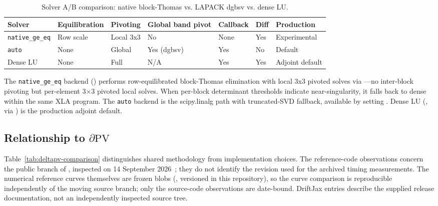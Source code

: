 \begin{table}[tbp]
\centering
\caption{Solver A/B comparison: native block-Thomas vs. LAPACK dgbsv vs. dense LU.}
\label{tab:solver-ab}
\begin{tabular}{@{}lllllll@{}}
\toprule
Solver & Equilibration & Pivoting & Global band pivot & Callback & Diff & Production \\
\midrule
\texttt{native\_ge\_eq} & Row scale & Local 3x3 & No & None & Yes & Experimental \\
\texttt{auto} & None & Global & Yes (dgbsv) & Yes & No & Default \\
Dense LU & None & Full & N/A & Yes & Yes & Adjoint default \\
\bottomrule
\end{tabular}
\end{table}


The \texttt{native\_ge\_eq} backend () performs row-equilibrated block-Thomas elimination with local 3x3 pivoted solves via ---no inter-block pivoting but per-element 3×3 pivoted local solves. When per-block determinant thresholds indicate near-singularity, it falls back to dense  within the same XLA program. The \texttt{auto} backend is the scipy.linalg  path with truncated-SVD fallback, available by setting . Dense LU (, via ) is the production adjoint default.

\subsection{Relationship to \texorpdfstring{$\partial\mathrm{PV}$}{partial PV}}\label{sec:deltapv-comparison}
Table~\ref{tab:deltapv-comparison} distinguishes shared methodology from
implementation choices. The reference-code observations concern the
public  branch of , inspected on
14 September 2026~\cite{deltapvsource}; they do not identify the revision
used for the archived timing measurements. The numerical reference
curves themselves are frozen blobs
(, versioned in
this repository), so the curve comparison is reproducible independently
of the moving source branch; only the source-code observations are
date-bound. DriftJax entries describe the
supplied release documentation, not an independently inspected source tree.

